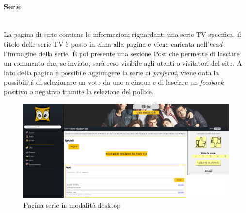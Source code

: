 \paragraph{Serie}
~\\
La pagina di serie contiene le informazioni riguardanti una serie TV specifica, il titolo delle serie TV è posto in cima alla pagina e viene caricata nell'\textit{head} l'immagine della serie. È poi presente una sezione Post che permette di lasciare un commento che, se inviato, sarà reso visibile agli utenti o visitatori del sito. A lato della pagina è possibile aggiungere la serie ai \textit{preferiti}, viene data la possibilità di selezionare un voto da uno a cinque e di lasciare un \textit{feedback} positivo o negativo tramite la selezione del pollice. 

\begin{figure}[H]
	\centerline{\includegraphics[scale= 0.33]{img/serie.png}}
	\caption{Pagina serie in modalità desktop}
	
\end{figure}

